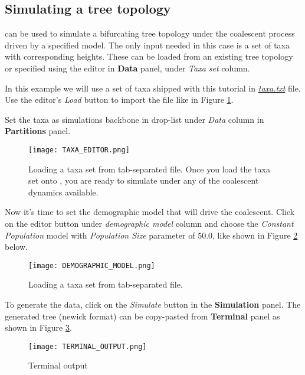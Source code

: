 \subsection{Simulating a tree topology}
{\bussname} can be used to simulate a bifurcating tree topology under the coalescent process driven by a specified model. 
The only input needed in this case is a set of taxa with corresponding heights. 
These can be loaded from an existing tree topology or specified using the editor in \textbf{Data} panel, under \emph{Taxa set} column.

In this example we will use a set of taxa shipped with this tutorial in \href{http://rega.kuleuven.be/cev/ecv/software/buss_files/taxa.txt}{\emph{taxa.txt}} file. Use the editor's \emph{Load} button to import the file like in Figure \ref{fig:TaxaEditor}.

Set the taxa as simulations backbone in drop-list under \emph{Data} column in \textbf{Partitions} panel.

\begin{figure}[H]
\begin{center}
\texttt{[image: TAXA\_EDITOR.png]} 
\end{center}
\caption{
Loading a taxa set from tab-separated file. Once you load the taxa set onto {\bussname}, you are ready to simulate under any of the coalescent dynamics available. 
} %
\label{fig:TaxaEditor}
\end{figure}   

Now it's time to set the demographic model that will drive the coalescent. Click on the editor button under \emph{demographic model} column and choose the \emph{Constant Population} model with \emph{Population Size} parameter of $50.0$, like shown in Figure \ref{fig:DemoModel} below.

\begin{figure}[H]
\begin{center}
\texttt{[image: DEMOGRAPHIC\_MODEL.png]} 
\end{center}
\caption{
Loading a taxa set from tab-separated file.
} %
\label{fig:DemoModel}
\end{figure}  

To generate the data, click on the \emph{Simulate} button in the \textbf{Simulation} panel. The generated tree (newick format) can be copy-pasted from \textbf{Terminal} panel as shown in Figure \ref{fig:Terminal}.

\begin{figure}[H]
\begin{center}
\texttt{[image: TERMINAL\_OUTPUT.png]} 
\end{center}
\caption{
Terminal output
} %
\label{fig:Terminal}
\end{figure} 

